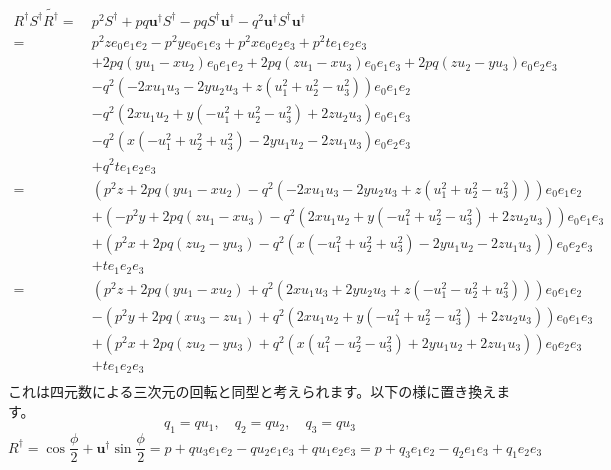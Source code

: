 \documentclass[a4paper,12pt,notitlepage]{jsreport}
\begin{document}
\begin{equation}
  \begin{split}
    R^\dag S^\dag \widetilde{R^\dag} 
    = ~ & p^2 S^\dag + p q \bm{u}^\dag S^\dag - p q S^\dag \bm{u}^\dag - q^2 \bm{u}^\dag S^\dag \bm{u}^\dag \\
    = ~ & p^2 z e_0e_1e_2 - p^2 y e_0e_1e_3 + p^2 x e_0e_2e_3 + p^2 t e_1e_2e_3 \\
    & + 2 p q (y u_1 - x u_2) e_0e_1e_2 + 2 p q (z u_1 - x u_3) e_0e_1e_3 + 2 p q (z u_2 - y u_3) e_0e_2e_3 \\
    & - q^2 (- 2 x u_1 u_3 - 2 y u_2 u_3 + z (u_1^2 + u_2^2 - u_3^2)) e_0e_1e_2 \\
    & - q^2 (2 x u_1 u_2 + y ( - u_1^2 + u_2^2 - u_3^2) + 2 z u_2 u_3) e_0e_1e_3 \\
    & - q^2 (x ( - u_1^2 + u_2^2 + u_3^2) - 2 y u_1 u_2 - 2 z u_1 u_3) e_0e_2e_3 \\
    & + q^2 t e_1e_2e_3 \\
    = ~ &(p^2 z + 2 p q (y u_1 - x u_2) - q^2 (- 2 x u_1 u_3 - 2 y u_2 u_3 + z (u_1^2 + u_2^2 - u_3^2))) e_0e_1e_2 \\
    & + (- p^2 y + 2 p q (z u_1 - x u_3) - q^2 (2 x u_1 u_2 + y ( - u_1^2 + u_2^2 - u_3^2) + 2 z u_2 u_3)) e_0e_1e_3 \\
    & + (p^2 x + 2 p q (z u_2 - y u_3) - q^2 (x ( - u_1^2 + u_2^2 + u_3^2) - 2 y u_1 u_2 - 2 z u_1 u_3)) e_0e_2e_3 \\
    & + t e_1e_2e_3 \\
    = ~ &(p^2 z + 2 p q (y u_1 - x u_2) + q^2 (2 x u_1 u_3 + 2 y u_2 u_3 + z ( - u_1^2 - u_2^2 + u_3^2))) e_0e_1e_2 \\
    & - (p^2 y + 2 p q (x u_3 - z u_1) + q^2 (2 x u_1 u_2 + y ( - u_1^2 + u_2^2 - u_3^2) + 2 z u_2 u_3)) e_0e_1e_3 \\
    & + (p^2 x + 2 p q (z u_2 - y u_3) + q^2 (x (u_1^2 - u_2^2 - u_3^2) + 2 y u_1 u_2 + 2 z u_1 u_3)) e_0e_2e_3 \\
    & + t e_1e_2e_3 \\
  \end{split}
\end{equation}
これは四元数による三次元の回転と同型と考えられます。以下の様に置き換えます。
\begin{equation}
  q_1 = q u_1 , \quad q_2 = q u_2 , \quad q_3 = q u_3
\end{equation}
\begin{equation}
  R^\dag = \cos \frac{\phi}{2} + \bm{u}^\dag \sin \frac{\phi}{2}
  = p + q u_3 e_1e_2 - q u_2 e_1e_3 + q u_1 e_2e_3
  = p + q_3 e_1e_2 - q_2 e_1e_3 + q_1 e_2e_3
\end{equation}
\end{document}

